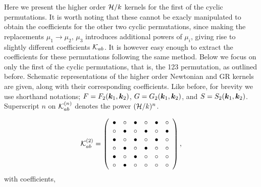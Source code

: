Here we present the higher order \(\mathcal{H}/k\) kernels for the first of the cyclic permutations. It is worth noting that these cannot be exacly manipulated to obtain the coefficients for the other two cyclic permutations, since making the replacements \(\mu_1 \to \mu_2, \, \mu_3\) introduces additional powers of \(\mu_i\), giving rise to slightly different coefficients \(\mathcal{K}_{ab}\). It is however easy enough to extract the coefficients for these permutations following the same method. Below we focus on only the first of the cyclic permutations, that is, the 123 permutation, as outlined before. Schematic representations of the higher order Newtonian and GR kernels are given, along with their corresponding coefficients. Like before, for brevity we use shorthand notations; \(F = F_2(\bm {k}_1,\bm {k}_2)\), \(G = G_2(\bm {k}_1,\bm {k}_2)\), and \(S = S_2(\bm {k}_1,\bm {k}_2)\). Superscript \(n\) on \(\mathcal{K}_{ab}^{(n)}\) denotes the power \((\mathcal{H}/k)^n\).

\begin{equation}
\mathcal{K}_{ab}^{(2)} =  \left( \begin {array}{cccccc} \bullet &\circ &\bullet &\circ 
&\bullet &\circ \\  \circ &\bullet &\circ &
\bullet &\circ &\bullet \\  \bullet &\circ 
&\bullet &\circ &\bullet &\circ \\  \circ &
\bullet &\circ &\bullet &\circ &\circ \\  
\bullet &\circ &\bullet &\circ &\circ &\circ 
\\  \circ &\bullet &\circ &\circ &\circ &
\circ \end {array} \right),
\end{equation}
with coefficients, 

